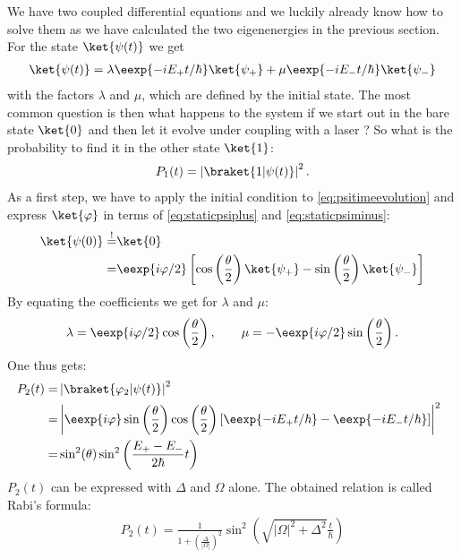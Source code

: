 We have two coupled differential equations and we luckily already know how to solve them as we have calculated the two eigenenergies in the previous section. For the state $\ket{\psi(t)}$ we get
\begin{align}
 \ket{\psi(t)}=\lambda \eexp{-i{E_+}t/{\hbar}} \ket{\psi_+} + \mu \eexp{-i{E_-}t/{\hbar}} \ket{\psi_-} \label{eq:psitimeevolution}
\end{align}
with the factors $\lambda$ and $\mu$, which are defined by the initial state. The most common question is then what happens to the system if we start out in the bare state $\ket{0}$ and then let it evolve under coupling with a laser ? So what is the probability to find it in the other state $\ket{1}$:
\begin{align}
	P_1(t)=\left|\braket{1|\psi(t)}\right|^2.
\end{align}
 As a first step, we have to apply the initial condition to \eqref{eq:psitimeevolution} and express $\ket{\varphi}$ in terms of \eqref{eq:staticpsiplus} and \eqref{eq:staticpsiminus}:
				\begin{align}
					\ket{\psi(0)} \overset{!}{=}& \ket{0}\\
											  = & \eexp{i{\varphi}/{2}} \left[ \cos\left( \frac{\theta}{2}\right) \ket{\psi_+}-\sin\left(\frac{\theta}{2}\right)\ket{\psi_-}\right]
				\end{align}
				By equating the coefficients we get for $\lambda$ and $\mu$:
				\begin{align}
					\lambda = \eexp{i{\varphi}/{2}}\cos\left(\frac{\theta}{2}\right), \qquad  \mu = -\eexp{i{\varphi}/{2}}\sin\left(\frac{\theta}{2}\right).
				\end{align}
				One thus gets:
				\begin{align}
					\hspace{-2mm} P_2(t)	=&\left|\braket{\varphi_2|\psi(t)}\right|^2 \\
											=& \left|\eexp{i\varphi} \sin\left(\frac{\theta}{2}\right)\cos\left(\frac{\theta}{2}\right)\left[\eexp{-i{E_+}t/{\hbar}} - \eexp{-i{E_-}t/{\hbar}}\right]\right|^2\\
											=& \sin^2(\theta)\sin^2\left(\frac{E_+-E_-}{2\hbar}t\right)
				\end{align}
$P_2(t)$ can be expressed with $\Delta$ and $\Omega$ alone. The obtained relation is called Rabi's formula:
\begin{align}
 P_2(t)=\frac{1}{1+\left(\frac{\Delta}{|\Omega|}\right)^2}\sin^2\left(\sqrt{|\Omega|^2+\Delta^2}\frac{t}{\hbar}\right)
\end{align}